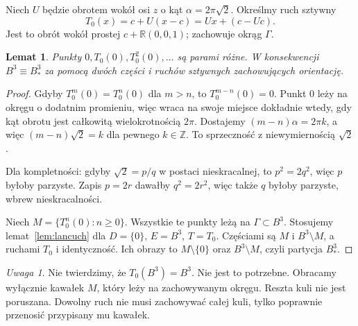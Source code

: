 \documentclass[11pt,a4paper]{article}
\numberwithin{equation}{section}
\theoremstyle{plain}
\newtheorem{lemat}[twierdzenie]{Lemat}
\theoremstyle{definition}
\theoremstyle{remark}
\newtheorem{uwaga}[twierdzenie]{Uwaga}
\newcommand{\R}{\mathbb R}
\newcommand{\Z}{\mathbb Z}
\begin{document}
Niech $U$ będzie obrotem wokół osi $z$ o kąt $\alpha=2\pi\sqrt2$. Określmy ruch sztywny
\begin{equation}\label{eq:8-1}
 T_0(x)=c+U(x-c)=Ux+(c-Uc).
\end{equation}
Jest to obrót wokół prostej $c+\R(0,0,1)$; zachowuje okrąg $\Gamma$.
\begin{lemat}\label{lem:wchloniecie-srodka}
Punkty $0,T_0(0),T_0^2(0),\ldots$ są parami różne. W konsekwencji $B^3\equiv B^3_*$ za pomocą dwóch części i ruchów sztywnych zachowujących orientację.
\end{lemat}
\begin{proof}
Gdyby $T_0^m(0)=T_0^n(0)$ dla $m>n$, to $T_0^{m-n}(0)=0$. Punkt $0$ leży na okręgu o dodatnim promieniu, więc wraca na swoje miejsce dokładnie wtedy, gdy kąt obrotu jest całkowitą wielokrotnością $2\pi$. Dostajemy $(m-n)\alpha=2\pi k$, a więc $(m-n)\sqrt2=k$ dla pewnego $k\in\Z$. To sprzeczność z niewymiernością $\sqrt2$.

Dla kompletności: gdyby $\sqrt2=p/q$ w postaci nieskracalnej, to $p^2=2q^2$, więc $p$ byłoby parzyste. Zapis $p=2r$ dawałby $q^2=2r^2$, więc także $q$ byłoby parzyste, wbrew nieskracalności.

Niech $M=\{T_0^n(0):n\ge0\}$. Wszystkie te punkty leżą na $\Gamma\subset B^3$. Stosujemy lemat~\ref{lem:lancuch} dla $D=\{0\}$, $E=B^3$, $T=T_0$. Częściami są $M$ i $B^3\setminus M$, a ruchami $T_0$ i identyczność. Ich obrazy to $M\setminus\{0\}$ oraz $B^3\setminus M$, czyli partycja $B^3_*$.
\end{proof}
\begin{uwaga}
Nie twierdzimy, że $T_0(B^3)=B^3$. Nie jest to potrzebne. Obracamy wyłącznie kawałek $M$, który leży na zachowywanym okręgu. Reszta kuli nie jest poruszana. Dowolny ruch nie musi zachowywać całej kuli, tylko poprawnie przenosić przypisany mu kawałek.
\end{uwaga}
\end{document}
